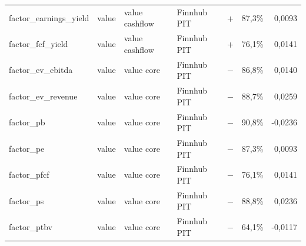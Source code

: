 \begin{longtable}{p{4.0cm}p{1.7cm}p{3.0cm}p{2.0cm}rrr}
factor\_earnings\_yield & value & value cashflow & Finnhub PIT & + & 87,3\% & 0,0093 \\
factor\_fcf\_yield & value & value cashflow & Finnhub PIT & + & 76,1\% & 0,0141 \\
factor\_ev\_ebitda & value & value core & Finnhub PIT & − & 86,8\% & 0,0140 \\
factor\_ev\_revenue & value & value core & Finnhub PIT & − & 88,7\% & 0,0259 \\
factor\_pb & value & value core & Finnhub PIT & − & 90,8\% & -0,0236 \\
factor\_pe & value & value core & Finnhub PIT & − & 87,3\% & 0,0093 \\
factor\_pfcf & value & value core & Finnhub PIT & − & 76,1\% & 0,0141 \\
factor\_ps & value & value core & Finnhub PIT & − & 88,8\% & 0,0236 \\
factor\_ptbv & value & value core & Finnhub PIT & − & 64,1\% & -0,0117 \\
\end{longtable}
